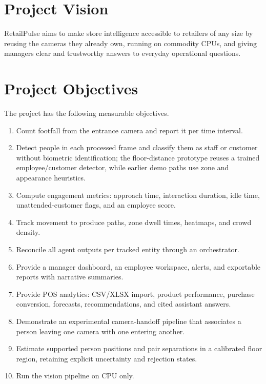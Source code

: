 \section{Project Vision}
RetailPulse aims to make store intelligence accessible to retailers of any size by reusing the cameras they already own, running on commodity CPUs, and giving managers clear and trustworthy answers to everyday operational questions.

\section{Project Objectives}
The project has the following measurable objectives.
\begin{enumerate}[label=O\arabic*.]
\item Count footfall from the entrance camera and report it per time interval.
\item Detect people in each processed frame and classify them as staff or customer without biometric identification; the floor-distance prototype reuses a trained employee/customer detector, while earlier demo paths use zone and appearance heuristics.
\item Compute engagement metrics: approach time, interaction duration, idle time, unattended-customer flags, and an employee score.
\item Track movement to produce paths, zone dwell times, heatmaps, and crowd density.
\item Reconcile all agent outputs per tracked entity through an orchestrator.
\item Provide a manager dashboard, an employee workspace, alerts, and exportable reports with narrative summaries.
\item Provide POS analytics: CSV/XLSX import, product performance, purchase conversion, forecasts, recommendations, and cited assistant answers.
\item Demonstrate an experimental camera-handoff pipeline that associates a person leaving one camera with one entering another.
\item Estimate supported person positions and pair separations in a calibrated floor region, retaining explicit uncertainty and rejection states.

\item Run the vision pipeline on CPU only.
\end{enumerate}


